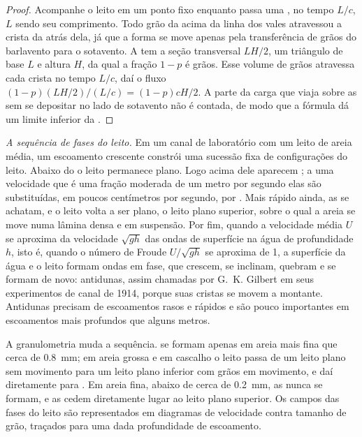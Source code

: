 \begin{proof}
Acompanhe o leito em um ponto fixo enquanto passa uma , no tempo $L/c$, $L$ sendo seu comprimento. Todo grão da  acima da linha dos vales atravessou a crista da  atrás dela, já que a forma se move apenas pela transferência de grãos do barlavento para o sotavento. A  tem a seção transversal $LH/2$, um triângulo de base $L$ e altura $H$, da qual a fração $1 - p$ é grãos. Esse volume de grãos atravessa cada crista no tempo $L/c$, daí o fluxo $(1-p)(LH/2)/(L/c) = (1-p)cH/2$. A parte da carga que viaja sobre as  sem se depositar no lado de sotavento não é contada, de modo que a fórmula dá um limite inferior da .
\end{proof}

\emph{A sequência de fases do leito.} Em um canal de laboratório com um leito de areia média, um escoamento crescente constrói uma sucessão fixa de configurações do leito. Abaixo do  o leito permanece plano. Logo acima dele aparecem ; a uma velocidade que é uma fração moderada de um metro por segundo elas são substituídas, em poucos centímetros por segundo, por . Mais rápido ainda, as  se achatam, e o leito volta a ser plano, o leito plano superior, sobre o qual a areia se move numa lâmina densa e em suspensão. Por fim, quando a velocidade média $U$ se aproxima da velocidade $\sqrt{gh}$ das ondas de superfície na água de profundidade $h$, isto é, quando o número de Froude $U/\sqrt{gh}$ se aproxima de 1, a superfície da água e o leito formam ondas em fase, que crescem, se inclinam, quebram e se formam de novo: antidunas, assim chamadas por G.~K. Gilbert em seus experimentos de canal de 1914, porque suas cristas se movem a montante. Antidunas precisam de escoamentos rasos e rápidos e são pouco importantes em escoamentos mais profundos que alguns metros.

A granulometria muda a sequência.  se formam apenas em areia mais fina que cerca de \qty{0.8}{mm}; em areia grossa e em cascalho o leito passa de um leito plano sem movimento para um leito plano inferior com grãos em movimento, e daí diretamente para . Em areia fina, abaixo de cerca de \qty{0.2}{mm}, as  nunca se formam, e as  cedem diretamente lugar ao leito plano superior. Os campos das fases do leito são representados em diagramas de velocidade contra tamanho de grão, traçados para uma dada profundidade de escoamento.

